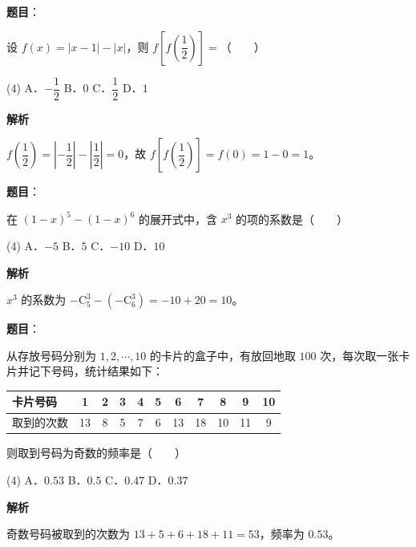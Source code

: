 \begin{answer}

\textbf{题目}：

设 $f(x) = |x - 1| - |x|$，则 $f\left[f\left(\dfrac{1}{2}\right)\right] =$\mbox{（　　）}

\begin{gkopts}(4)
\task A．$-\dfrac{1}{2}$
\task B．$0$
\task C．$\dfrac{1}{2}$
\task D．$1$
\end{gkopts}

\textbf{解析}

$f\left(\dfrac{1}{2}\right) = \left|-\dfrac{1}{2}\right| - \left|\dfrac{1}{2}\right| = 0$，故 $f\left[f\left(\dfrac{1}{2}\right)\right] = f(0) = 1 - 0 = 1$。


\end{answer}
\begin{answer}

\textbf{题目}：

在 $(1 - x)^5 - (1 - x)^6$ 的展开式中，含 $x^3$ 的项的系数是\mbox{（　　）}

\begin{gkopts}(4)
\task A．$-5$
\task B．$5$
\task C．$-10$
\task D．$10$
\end{gkopts}

\textbf{解析}

$x^3$ 的系数为 $-\mathrm{C}_5^3 - \left(-\mathrm{C}_6^3\right) = -10 + 20 = 10$。


\end{answer}
\begin{answer}

\textbf{题目}：

从存放号码分别为 $1, 2, \cdots, 10$ 的卡片的盒子中，有放回地取 $100$ 次，每次取一张卡片并记下号码，统计结果如下：

\begin{center}
\begingroup\setlength{\tabcolsep}{4pt}
\begin{tabular}{lcccccccccc}
\toprule
卡片号码 & 1 & 2 & 3 & 4 & 5 & 6 & 7 & 8 & 9 & 10 \\
\midrule
取到的次数 & 13 & 8 & 5 & 7 & 6 & 13 & 18 & 10 & 11 & 9 \\
\bottomrule
\end{tabular}
\endgroup
\end{center}

则取到号码为奇数的频率是\mbox{（　　）}

\begin{gkopts}(4)
\task A．$0.53$
\task B．$0.5$
\task C．$0.47$
\task D．$0.37$
\end{gkopts}

\textbf{解析}

奇数号码被取到的次数为 $13 + 5 + 6 + 18 + 11 = 53$，频率为 $0.53$。


\end{answer}
